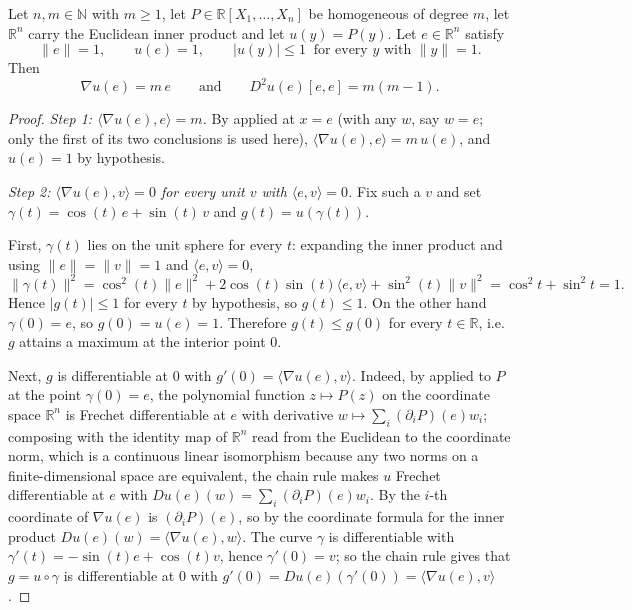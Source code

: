 \begin{lemma}
Let $n,m\in\mathbb{N}$ with $m\ge1$, let $P\in\mathbb{R}[X_1,\dots,X_n]$ be
homogeneous of degree $m$, let $\mathbb{R}^n$ carry the Euclidean inner product
and let $u(y)=P(y)$. Let $e\in\mathbb{R}^n$ satisfy
\[
  \lVert e\rVert=1,\qquad u(e)=1,\qquad
  \lvert u(y)\rvert\le1\ \text{ for every }y\text{ with }\lVert y\rVert=1 .
\]
Then
\[
  \nabla u(e)=m\,e
  \qquad\text{and}\qquad
  D^2u(e)[e,e]=m(m-1).
\]
\end{lemma}
\begin{proof}
\emph{Step 1: $\langle\nabla u(e),e\rangle=m$.} By 
applied at $x=e$ (with any $w$, say $w=e$; only the first of its two conclusions
is used here), $\langle\nabla u(e),e\rangle=m\,u(e)$, and $u(e)=1$ by
hypothesis.

\emph{Step 2: $\langle\nabla u(e),v\rangle=0$ for every unit $v$ with
$\langle e,v\rangle=0$.} Fix such a $v$ and set
$\gamma(t)=\cos(t)\,e+\sin(t)\,v$ and $g(t)=u(\gamma(t))$.

First, $\gamma(t)$ lies on the unit sphere for every $t$: expanding the inner
product and using $\lVert e\rVert=\lVert v\rVert=1$ and $\langle e,v\rangle=0$,
\[
  \lVert\gamma(t)\rVert^2
  =\cos^2(t)\lVert e\rVert^2+2\cos(t)\sin(t)\langle e,v\rangle+\sin^2(t)\lVert v\rVert^2
  =\cos^2 t+\sin^2 t=1 .
\]
Hence $\lvert g(t)\rvert\le1$ for every $t$ by hypothesis, so $g(t)\le1$. On the
other hand $\gamma(0)=e$, so $g(0)=u(e)=1$. Therefore $g(t)\le g(0)$ for every
$t\in\mathbb{R}$, i.e. $g$ attains a maximum at the interior point $0$.

Next, $g$ is differentiable at $0$ with $g'(0)=\langle\nabla u(e),v\rangle$.
Indeed, by  applied to $P$ at the point $\gamma(0)=e$, the
polynomial function $z\mapsto P(z)$ on the coordinate space $\mathbb{R}^n$ is
Frechet differentiable at $e$ with derivative
$w\mapsto\sum_i(\partial_iP)(e)w_i$; composing with the identity map of
$\mathbb{R}^n$ read from the Euclidean to the coordinate norm, which is a
continuous linear isomorphism because any two norms on a finite-dimensional
space are equivalent, the chain rule makes $u$ Frechet differentiable at $e$
with $Du(e)(w)=\sum_i(\partial_iP)(e)w_i$. By  the
$i$-th coordinate of $\nabla u(e)$ is $(\partial_iP)(e)$, so by the coordinate
formula for the inner product $Du(e)(w)=\langle\nabla u(e),w\rangle$. The curve
$\gamma$ is differentiable with $\gamma'(t)=-\sin(t)e+\cos(t)v$, hence
$\gamma'(0)=v$; so the chain rule gives that $g=u\circ\gamma$ is differentiable
at $0$ with $g'(0)=Du(e)(\gamma'(0))=\langle\nabla u(e),v\rangle$.


\end{proof}
